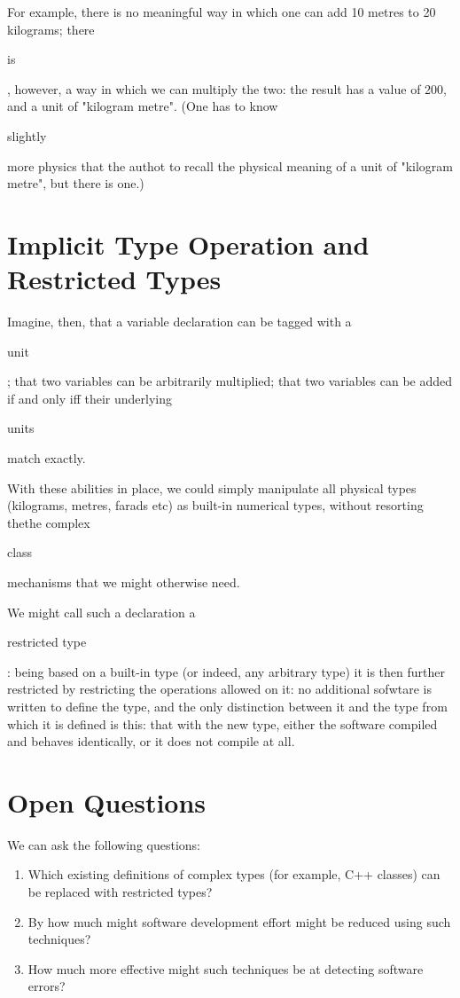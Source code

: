 \documentclass{eceasst}
\begin{document}
For example, there is no meaningful way in which one can add 10 metres
to 20 kilograms; there \begin{em}is\end{em}, however, a way in which
we can multiply the two: the result has a value of 200, and a unit of
"kilogram metre".  (One has to know \begin{em}slightly\end{em} more
physics that the authot to recall the physical meaning of a unit of
"kilogram metre", but there is one.)

\section{Implicit Type Operation and Restricted Types}

Imagine, then, that a variable declaration can be tagged with
a \begin{em}unit\end{em}; that two variables can be arbitrarily
multiplied; that two variables can be added if and only iff their
underlying \begin{em}units\end{em} match exactly.

With these abilities in place, we could simply manipulate all physical
types (kilograms, metres, farads etc) as built-in numerical types,
without resorting thethe complex \begin{em}class\end{em} mechanisms that
we might otherwise need.

We might call such a declaration a \begin{em}restricted type\end{em}:
being based on a built-in type (or indeed, any arbitrary type) it is
then further restricted by restricting the operations allowed on it:
no additional sofwtare is written to define the type, and the only
distinction between it and the type from which it is defined is this: that
with the new type, either the software compiled and behaves identically,
or it does not compile at all.

\section{Open Questions}

We can ask the following questions:

\begin{enumerate}

\item Which existing definitions of complex types (for example, C++
classes) can be replaced with restricted types?

\item By how much might software development effort might be reduced using such techniques?

\item How much more effective might such techniques be at detecting software errors?

\end{enumerate}


%
%
\end{document}
